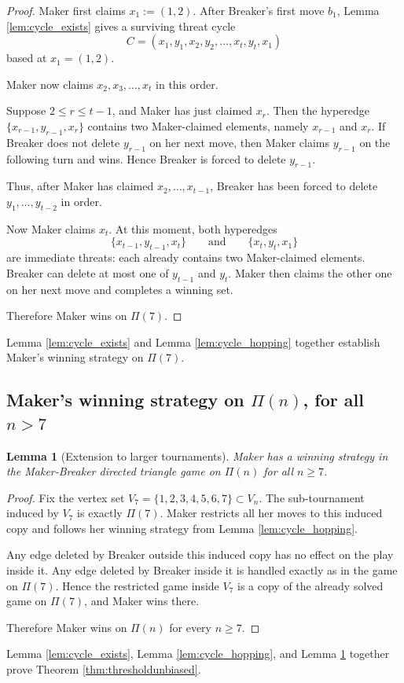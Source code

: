 \documentclass{article}
\theoremstyle{definition}
\theoremstyle{plain}
\newtheorem{lem}[theo]{Lemma}
\theoremstyle{remark}
\theoremstyle{definition}
\begin{document}
\begin{proof}
Maker first claims $x_1:=(1,2)$.
After Breaker's first move $b_1$, Lemma \ref{lem:cycle_exists} gives a surviving threat cycle
\[
C=(x_1,y_1,x_2,y_2,\ldots,x_t,y_t,x_1)
\]
based at $x_1=(1,2)$.

Maker now claims $x_2,x_3,\ldots,x_t$ in this order.

Suppose $2\le r\le t-1$, and Maker has just claimed $x_r$.
Then the hyperedge $\{x_{r-1},y_{r-1},x_r\}$ contains two Maker-claimed elements, namely $x_{r-1}$ and $x_r$.
If Breaker does not delete $y_{r-1}$ on her next move, then Maker claims $y_{r-1}$ on the following turn and wins.
Hence Breaker is forced to delete $y_{r-1}$.

Thus, after Maker has claimed $x_2,\dots,x_{t-1}$, Breaker has been forced to delete
$y_1,\dots,y_{t-2}$ in order.

Now Maker claims $x_t$.
At this moment, both hyperedges
\[
\{x_{t-1},y_{t-1},x_t\}
\qquad\text{and}\qquad
\{x_t,y_t,x_1\}
\]
are immediate threats: each already contains two Maker-claimed elements.
Breaker can delete at most one of $y_{t-1}$ and $y_t$.
Maker then claims the other one on her next move and completes a winning set.

Therefore Maker wins on $\Pi(7)$.
\end{proof}

Lemma \ref{lem:cycle_exists} and Lemma \ref{lem:cycle_hopping} together establish Maker's winning strategy on $\Pi(7)$.

\subsection{\texorpdfstring{Maker's winning strategy on $\Pi(n)$, for all $n > 7$}{Maker's winning strategy on Pi(n), for all n > 7}}

\begin{lem}[Extension to larger tournaments]\label{lem:extension}
Maker has a winning strategy in the Maker-Breaker directed triangle game on $\Pi(n)$ for all $n\ge 7$.
\end{lem}
\begin{proof}
Fix the vertex set $V_7=\{1,2,3,4,5,6,7\}\subset V_n$.
The sub-tournament induced by $V_7$ is exactly $\Pi(7)$.
Maker restricts all her moves to this induced copy and follows her winning strategy from Lemma \ref{lem:cycle_hopping}.

Any edge deleted by Breaker outside this induced copy has no effect on the play inside it.
Any edge deleted by Breaker inside it is handled exactly as in the game on $\Pi(7)$.
Hence the restricted game inside $V_7$ is a copy of the already solved game on $\Pi(7)$, and Maker wins there.

Therefore Maker wins on $\Pi(n)$ for every $n\ge 7$.

\end{proof}
Lemma \ref{lem:cycle_exists}, Lemma \ref{lem:cycle_hopping}, and Lemma \ref{lem:extension} together prove Theorem \ref{thm:thresholdunbiased}.
\end{document}
